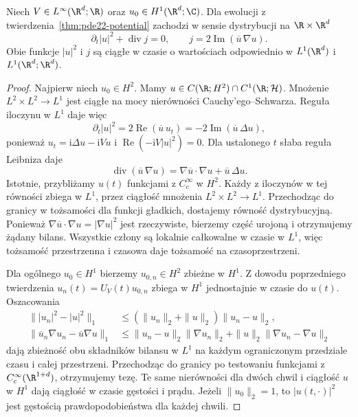 \begin{stwierdzenie}
Niech $V\in L^\infty(\R^d;\R)$ oraz
$u_0\in H^1(\R^d;\C)$. Dla ewolucji z
twierdzenia~\ref{thm:pde22-potential} zachodzi w sensie
dystrybucji na $\R\times\R^d$
\[
 \partial_t|u|^2+\operatorname{div}j=0,
 \qquad j=2\operatorname{Im}(\overline u\,\nabla u).
\]
Obie funkcje $|u|^2$ i $j$ są ciągłe w czasie
o wartościach odpowiednio w $L^1(\R^d)$
i $L^1(\R^d;\R^d)$.
\end{stwierdzenie}
\begin{proof}
Najpierw niech $u_0\in H^2$. Mamy
$u\in C(\R;H^2)\cap C^1(\R;\mathcal H)$.
Mnożenie $L^2\times L^2\to L^1$ jest ciągłe
na mocy nierówności Cauchy'ego--Schwarza.
Reguła iloczynu w $L^1$ daje więc
\[
 \partial_t|u|^2=2\operatorname{Re}(\overline u\,u_t)
 =-2\operatorname{Im}(\overline u\,\Delta u),
\]
ponieważ $u_t=\mathrm i\Delta u-\mathrm iVu$
i $\operatorname{Re}(-\mathrm i V|u|^2)=0$.
Dla ustalonego $t$ słaba reguła Leibniza daje
\[
 \operatorname{div}(\overline u\,\nabla u)
 =\nabla\overline u\cdot\nabla u+\overline u\,\Delta u .
\]
Istotnie, przybliżamy $u(t)$ funkcjami z
$C_c^\infty$ w $H^2$. Każdy z iloczynów w tej
równości zbiega w $L^1$, przez ciągłość mnożenia
$L^2\times L^2\to L^1$. Przechodząc do granicy
w tożsamości dla funkcji gładkich, dostajemy
równość dystrybucyjną. Ponieważ
$\nabla\overline u\cdot\nabla u=|\nabla u|^2$
jest rzeczywiste, bierzemy część urojoną
i otrzymujemy żądany bilans. Wszystkie człony
są lokalnie całkowalne w czasie w $L^1$,
więc tożsamość przestrzenna i czasowa daje
tożsamość na czasoprzestrzeni.

Dla ogólnego $u_0\in H^1$ bierzemy $u_{0,n}\in H^2$
zbieżne w $H^1$. Z dowodu poprzedniego twierdzenia
$u_n(t)=U_V(t)u_{0,n}$ zbiega w $H^1$ jednostajnie
w czasie do $u(t)$. Oszacowania
\[
 \begin{split}
 \||u_n|^2-|u|^2\|_1
 &\le(\|u_n\|_2+\|u\|_2)\|u_n-u\|_2,\\
 \|\overline u_n\nabla u_n-\overline u\nabla u\|_1
 &\le\|u_n-u\|_2\|\nabla u_n\|_2+
       \|u\|_2\|\nabla u_n-\nabla u\|_2
 \end{split}
\]
dają zbieżność obu składników bilansu w
$L^1$ na każdym ograniczonym przedziale czasu
i całej przestrzeni. Przechodząc do granicy
po testowaniu funkcjami z $C_c^\infty(\R^{1+d})$,
otrzymujemy tezę. Te same nierówności dla dwóch
chwil i ciągłość $u$ w $H^1$ dają ciągłość
w czasie gęstości i prądu.
Jeżeli $\|u_0\|_2=1$, to $|u(t,\cdot)|^2$ jest
gęstością prawdopodobieństwa dla każdej chwili.
\end{proof}

